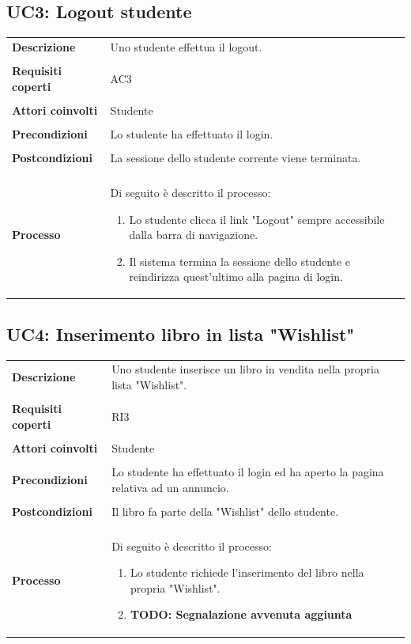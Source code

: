 \documentclass[10pt,a4paper]{report}
\begin{document}
	\subsection{UC3: Logout studente}
	\begin{tabular}{lp{}}
		\textbf{Descrizione}&Uno studente effettua il logout.\\
		\\
		\textbf{Requisiti coperti}&AC3\\
		\\
		\textbf{Attori coinvolti}&Studente\\
		\\
		\textbf{Precondizioni}&Lo studente ha effettuato il login.\\
		\\
		\textbf{Postcondizioni}&La sessione dello studente corrente viene terminata.\\
		\\
		\textbf{Processo}&Di seguito è descritto il processo:
		\begin{enumerate}
			\item Lo studente clicca il link "Logout" sempre accessibile dalla barra di navigazione.
			\item Il sistema termina la sessione dello studente e reindirizza quest'ultimo alla pagina di login.
		\end{enumerate}
	\end{tabular}

	\subsection{UC4: Inserimento libro in lista "Wishlist"}
	\begin{tabular}{lp{}}
		\textbf{Descrizione}&Uno studente inserisce un libro in vendita nella propria lista "Wishlist".\\
		\\
		\textbf{Requisiti coperti}&RI3\\
		\\
		\textbf{Attori coinvolti}&Studente\\
		\\
		\textbf{Precondizioni}&Lo studente ha effettuato il login ed ha aperto la pagina relativa ad un annuncio.\\
		\\
		\textbf{Postcondizioni}&Il libro fa parte della "Wishlist" dello studente.\\
		\\
		\textbf{Processo}&Di seguito è descritto il processo:
		\begin{enumerate}
			\item Lo studente richiede l'inserimento del libro nella propria "Wishlist".
			\item \textbf{TODO: Segnalazione avvenuta aggiunta}
		\end{enumerate}
	\end{tabular}
\end{document}
